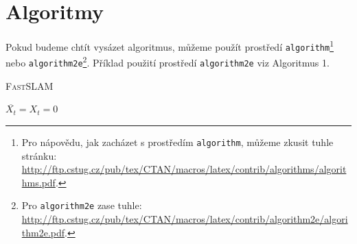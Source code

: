 \documentclass[11pt, a4paper]{article}
\begin{document}
\section{Algoritmy}
Pokud budeme chtít vysázet algoritmus, můžeme použít prostředí \texttt{algorithm}\footnote{Pro nápovědu, jak zacházet s prostředím \texttt{algorithm}, můžeme zkusit tuhle stránku:\\
\url{http://ftp.cstug.cz/pub/tex/CTAN/macros/latex/contrib/algorithms/algorithms.pdf}.} nebo \texttt{algorithm2e}\footnote{Pro \texttt{algorithm2e} zase tuhle:
\url{http://ftp.cstug.cz/pub/tex/CTAN/macros/latex/contrib/algorithm2e/algorithm2e.pdf}.}.
Příklad použití prostředí \texttt{algorithm2e} viz Algoritmus 1. %
\\[2em]
\begin{algorithm}[H]
\label{algo-fastslam}
\caption{\textsc{FastSLAM}}
    \DontPrintSemicolon
    \BlankLine
    $\overline{X_t} = X_t = 0$\;
\end{algorithm}
\end{document}

